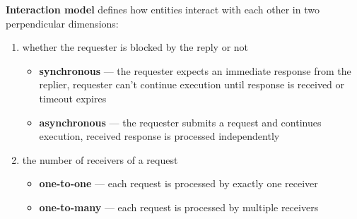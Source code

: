 \documentclass[thesis=M,english,hidelinks]{FITthesis}[2012/10/20]
\begin{document}
\textbf{Interaction model} defines how entities interact with each other in two perpendicular dimensions:
\begin{enumerate}
    \item whether the requester is blocked by the reply or not
    \begin{itemize}
        \item \textbf{synchronous} --- the requester expects an immediate response from the replier, requester can't continue execution until response is received or timeout expires
        \item \textbf{asynchronous} --- the requester submits a request and continues execution, received response is processed independently
    \end{itemize}
    
    \item the number of receivers of a request
    \begin{itemize}
        \item \textbf{one-to-one} ---  each request is processed by exactly one receiver
        \item \textbf{one-to-many} --- each request is processed by multiple receivers
    \end{itemize}
\end{enumerate}
\end{document}

